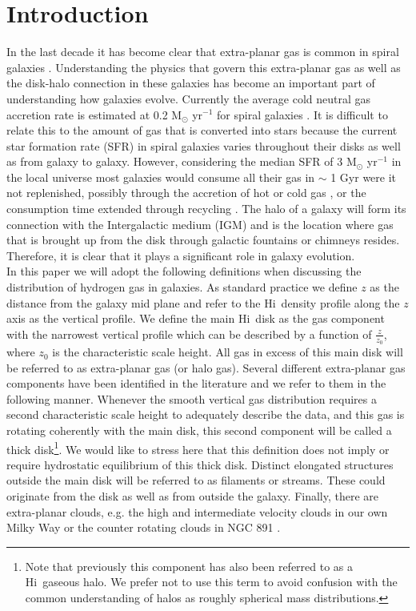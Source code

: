 \documentclass[useAMS,usenatbib]{mn2e}
\newcommand\HI{H{\sc i}}
\begin{document}
\section{Introduction}
In the last decade it has become clear that extra-planar gas is common in spiral galaxies \citep{2003A&A...406..505R,Sancisi2008}.  Understanding the physics that govern this extra-planar gas as well as the disk-halo connection in these galaxies has become an important part of understanding how galaxies evolve. Currently the average cold neutral gas accretion rate is estimated at 0.2 M$_{\odot}$ yr$^{-1} $ for spiral galaxies  \citep{Sancisi2008}. It is difficult to relate this to the amount of gas that is converted into stars because the current star formation rate (SFR) in spiral galaxies varies throughout their disks as well as from galaxy to galaxy. However, considering the median SFR of 3  M$_{\odot}$ yr$^{-1} $ in the local universe \citep{2011MNRAS.415.1815B} most  galaxies would consume all their gas in $\sim$ 1 Gyr were it not replenished, possibly through the accretion of hot or cold  gas \citep{2005MNRAS.363....2K}, or the  consumption time extended through recycling \citep{Kennicut1994}. The halo of a galaxy will form its connection with the Intergalactic medium (IGM) and is the location where gas that is brought up from  the disk through galactic fountains  \citep{1976ApJ...205..762S,1980ApJ...236..577B} or chimneys \citep{1989ApJ...345..372N} resides. Therefore, it is clear that it plays a significant role in galaxy evolution.\\
\indent In this paper we will adopt the following definitions when discussing the distribution of hydrogen gas in galaxies. As standard practice we define $z$ as the distance from the galaxy mid plane and refer to the \HI\ density profile along the $z$ axis as the vertical profile. We define the main \HI\ disk as the gas component with the narrowest vertical profile which can be described by a function of $\frac{z}{z_0}$, where $z_0$ is the characteristic scale height. All gas in excess of this main disk will be referred to as extra-planar gas (or halo gas). Several different extra-planar gas components have been identified in the literature and we refer to them in the following manner. Whenever the smooth vertical gas distribution requires a second characteristic scale height to adequately describe the data, and this gas is rotating coherently with the main disk, this second component will be called a thick disk\footnote{Note that previously this component has also been referred to as a \HI\ gaseous halo. We prefer not to use this term to avoid confusion with the common understanding of halos as roughly spherical mass distributions.}. We would like to stress here that this definition does not imply or require hydrostatic equilibrium of this thick disk. Distinct elongated structures outside the main disk will be referred to as filaments or streams. These could originate from the disk as well as from outside the galaxy. Finally, there are extra-planar clouds, e.g. the high and intermediate velocity clouds in our own Milky Way \citep{1963CRAS..257.1661M,1997ARA&A..35..217W} or the counter rotating clouds in NGC 891 \citep{Oosterloo2007}.\\
\end{document}
